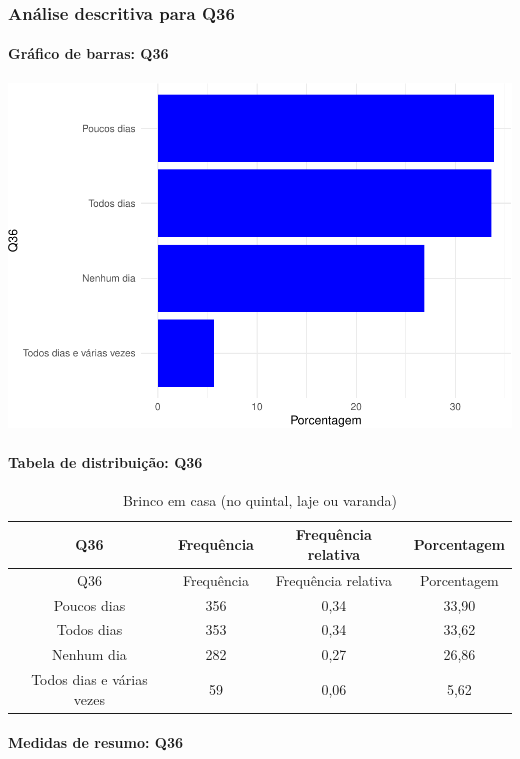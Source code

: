 \documentclass[]{article}
\let\oldparagraph\paragraph
\renewcommand{\paragraph}[1]{\oldparagraph{#1}\mbox{}}
\begin{document}
\hypertarget{anuxe1lise-descritiva-para-q36}{%
\subsubsection{Análise descritiva para Q36}\label{anuxe1lise-descritiva-para-q36}}

\hypertarget{gruxe1fico-de-barras-q36}{%
\paragraph{Gráfico de barras: Q36}\label{gruxe1fico-de-barras-q36}}

\begin{center}\includegraphics[width=0.75\linewidth]{relatorio_covid19_files/figure-latex/unnamed-chunk-1308-1} \end{center}

\hypertarget{tabela-de-distribuiuxe7uxe3o-q36}{%
\paragraph{Tabela de distribuição: Q36}\label{tabela-de-distribuiuxe7uxe3o-q36}}

\begin{longtable}[]{@{}cccc@{}}
\caption{\label{tab:unnamed-chunk-1309}Brinco em casa (no quintal, laje ou varanda)}\tabularnewline
\toprule
Q36 & Frequência & Frequência relativa & Porcentagem\tabularnewline
\midrule
\endfirsthead
\toprule
Q36 & Frequência & Frequência relativa & Porcentagem\tabularnewline
\midrule
\endhead
Poucos dias & 356 & 0,34 & 33,90\tabularnewline
Todos dias & 353 & 0,34 & 33,62\tabularnewline
Nenhum dia & 282 & 0,27 & 26,86\tabularnewline
Todos dias e várias vezes & 59 & 0,06 & 5,62\tabularnewline
\bottomrule
\end{longtable}

\hypertarget{medidas-de-resumo-q36}{%
\paragraph{Medidas de resumo: Q36}\label{medidas-de-resumo-q36}}
\end{document}
